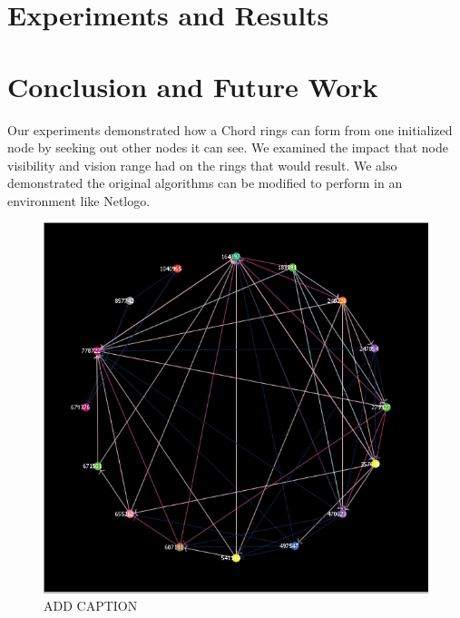 \documentclass[12pt]{article} %
\begin{document}
\section{Experiments and Results}


\section{Conclusion and Future Work}
Our experiments demonstrated how a Chord rings can form from one initialized node by seeking out other nodes it can see.  We examined the impact that  node visibility and vision range had on the rings that would result. We also demonstrated the original algorithms can be modified to perform in an environment like Netlogo.






\begin{figure}
\includegraphics[width=\linewidth]{example_problem}
\caption{ADD CAPTION}
\label{problem}
\end{figure}
\end{document}
